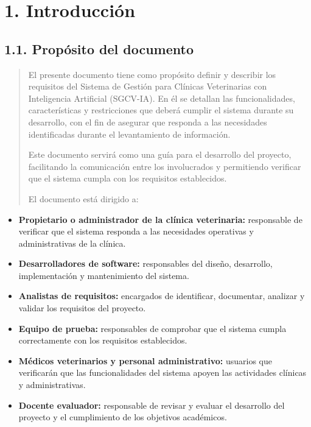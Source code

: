 \documentclass[
]{article}
\begin{document}
\section{1. Introducción}\label{introducciuxf3n}

\subsection{1.1. Propósito del
documento}\label{propuxf3sito-del-documento}

\begin{quote}
El presente documento tiene como propósito definir y describir los
requisitos del Sistema de Gestión para Clínicas Veterinarias con
Inteligencia Artificial (SGCV-IA). En él se detallan las
funcionalidades, características y restricciones que deberá cumplir el
sistema durante su desarrollo, con el fin de asegurar que responda a las
necesidades identificadas durante el levantamiento de información.

Este documento servirá como una guía para el desarrollo del proyecto,
facilitando la comunicación entre los involucrados y permitiendo
verificar que el sistema cumpla con los requisitos establecidos.

El documento está dirigido a:
\end{quote}

\begin{itemize}
\item
  \textbf{Propietario o administrador de la clínica veterinaria:}
  responsable de verificar que el sistema responda a las necesidades
  operativas y administrativas de la clínica.
\item
  \textbf{Desarrolladores de software:} responsables del diseño,
  desarrollo, implementación y mantenimiento del sistema.
\item
  \textbf{Analistas de requisitos:} encargados de identificar,
  documentar, analizar y validar los requisitos del proyecto.
\item
  \textbf{Equipo de prueba:} responsables de comprobar que el sistema
  cumpla correctamente con los requisitos establecidos.
\item
  \textbf{Médicos veterinarios y personal administrativo:} usuarios que
  verificarán que las funcionalidades del sistema apoyen las actividades
  clínicas y administrativas.
\item
  \textbf{Docente evaluador:} responsable de revisar y evaluar el
  desarrollo del proyecto y el cumplimiento de los objetivos académicos.
\end{itemize}
\end{document}
